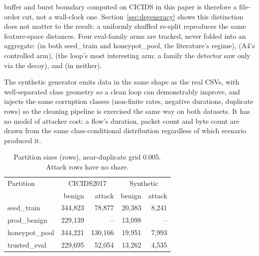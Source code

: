 buffer and burst boundary computed on CICIDS in this paper is therefore a file-order cut, not
a wall-clock one. Section~\ref{sec:degeneracy} shows this distinction does not matter to the
result: a uniformly shuffled re-split reproduces the same feature-space distances.
Four eval-family arms are tracked, never folded into an aggregate:  (in both
seed\_train and honeypot\_pool, the literature's regime),  (A4's controlled
arm),  (the loop's most interesting arm: a family the detector saw only
via the decoy), and  (in neither).

The synthetic generator emits data in the same shape as the real CSVs, with well-separated
class geometry so a clean loop can demonstrably improve, and injects the same corruption
classes (non-finite rates, negative durations, duplicate rows) so the cleaning pipeline is
exercised the same way on both datasets. It has no model of attacker cost: a flow's duration,
packet count and byte count are drawn from the same class-conditional distribution regardless
of which scenario produced it.

\begin{table}[t]
  \centering
  \caption{Partition sizes (rows), near-duplicate grid 0.005. Attack rows have no
  \texorpdfstring{}{prod\_benign} share.}
  \label{tab:partitions}
  \small
  \begin{tabular}{lrrrr}
    \toprule
    Partition & \multicolumn{2}{c}{CICIDS2017} & \multicolumn{2}{c}{Synthetic} \\
    & benign & attack & benign & attack \\
    \midrule
    seed\_train      & 344{,}823 & 78{,}877  & 20{,}383 & 8{,}241 \\
    prod\_benign     & 229{,}139 & --        & 13{,}098 & --      \\
    honeypot\_pool   & 344{,}221 & 130{,}166 & 19{,}951 & 7{,}993 \\
    trusted\_eval    & 229{,}695 & 52{,}054  & 13{,}262 & 4{,}535 \\
    \bottomrule
  \end{tabular}
\end{table}

